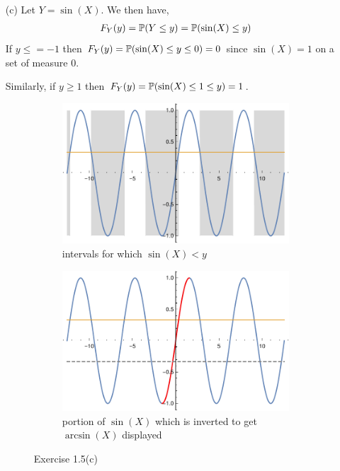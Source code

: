 \documentclass[10pt]{article}
\begin{document}
\begin{solution}[Solution]
\begin{enumerate}
    \item[(c)]
        Let \( Y=\sin(X) \). We then have,
        \begin{align*}
            F_Y(y) = \mathbb{P}(Y\leq y) = \mathbb{P}(\sin(X)\leq y) 
        \end{align*}
        If \( y\leq = -1 \) then \( F_Y(y)=\mathbb{P}(\sin(X)\leq y\leq 0) = 0 \) since \( \sin(X) = 1 \) on a set of measure 0. 
        
        Similarly, if \( y\geq 1 \) then \( F_Y(y) = \mathbb{P}(\sin(X)\leq1\leq y) = 1 \).

        \begin{figure}[h]
            \centering
            \begin{subfigure}{.45\textwidth}
                \includegraphics[width=.9\textwidth]{img/interval.pdf}
                \caption{intervals for which \( \sin(X) < y \)}
                \label{interval}
            \end{subfigure}
            \begin{subfigure}{.45\textwidth}
                \includegraphics[width=.9\textwidth]{img/inverse.pdf}
                \caption{portion of \( \sin(X) \) which is inverted to get \( \arcsin(X) \) displayed}
                \label{inverse}
        \end{subfigure}
            \caption{Exercise 1.5(c)}
        \end{figure}
 

\end{enumerate}
\end{solution}
\end{document}
